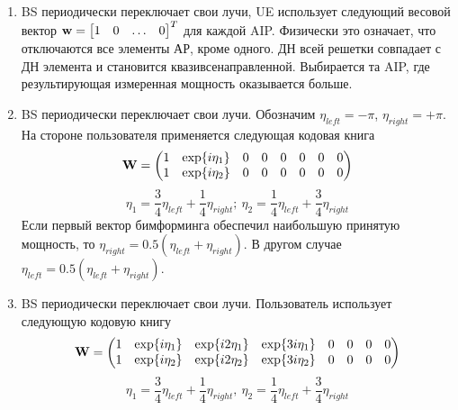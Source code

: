 \begin{enumerate}[label=\textbf{Шаг \arabic*:}]
    \item BS периодически переключает свои лучи, UE использует следующий весовой вектор $\vec w = \mqty*[1 & 0 & \dots & 0]^T$ для каждой AIP.
          Физически это означает, что отключаются все элементы АР, кроме одного. ДН всей решетки совпадает с ДН элемента и становится квазивсенаправленной.
          Выбирается та AIP, где результирующая измеренная мощность оказывается больше.
    \item BS периодически переключает свои лучи. Обозначим $\eta_{left} = - \pi$, $\eta_{right} = + \pi$.
          На стороне пользователя применяется следующая кодовая книга
          \begin{equation}
               \label{eq:4.51}
              \vec W =
              \begin{pmatrix}
                  \mqty{ 1 & \exp{i\eta_1}} & \zmat{1}{6} \\
                  \mqty{ 1 & \exp{i\eta_2}} & \zmat{1}{6} \\
              \end{pmatrix}
          \end{equation}
          \begin{equation}
              \eta_1 = \frac34 \eta_{left} + \frac14 \eta_{right}; ~ \eta_2 = \frac14 \eta_{left} + \frac34 \eta_{right}
          \end{equation}
          Если первый вектор бимформинга обеспечил наибольшую принятую мощность, то
          $\eta_{right} = 0.5 (\eta_{left} + \eta_{right})$.
          В другом случае
          $\eta_{left} = 0.5 (\eta_{left} + \eta_{right})$.
          
    \item BS периодически переключает свои лучи. Пользователь использует следующую кодовую книгу
          \begin{equation}
            \label{eq:4.53}
              \vec W =
              \begin{pmatrix}
                  \mqty{ 1 & \exp{i\eta_1} & \exp{i2\eta_1} & \exp{3i\eta_1}} & \zmat{1}{4} \\
                  \mqty{ 1 & \exp{i\eta_2} & \exp{i2\eta_2} & \exp{3i\eta_2}} & \zmat{1}{4} \\
              \end{pmatrix}
          \end{equation}
          \begin{equation}
              \eta_1 = \frac34 \eta_{left} + \frac14 \eta_{right}, ~ \eta_2 = \frac14 \eta_{left} + \frac34 \eta_{right}
          \end{equation}
          

\end{enumerate}

